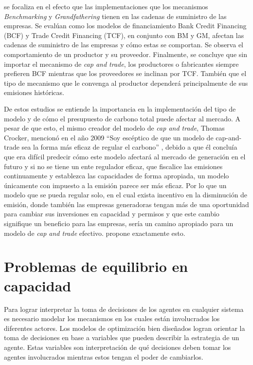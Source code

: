  se focaliza en el efecto que las implementaciones que los mecanismos \textit{Benchmarking} y \textit{Grandfathering} tienen en las cadenas de suministro de las empresas. Se evalúan como los modelos de financiamiento Bank Credit Financing (BCF) y Trade Credit Financing (TCF), en conjunto con BM y GM, afectan las cadenas de suministro de las empresas y cómo estas se comportan. Se observa el comportamiento de un productor y su proveedor. Finalmente, se concluye que sin importar el mecanismo de \textit{cap and trade}, los productores o fabricantes siempre prefieren BCF mientras que los proveedores se inclinan por TCF. También que el tipo de mecanismo que le convenga al productor dependerá principalmente de sus emisiones históricas.
\vspace{2.5mm}

De estos estudios se entiende la importancia en la implementación del tipo de modelo y de cómo el presupuesto de carbono total puede afectar al mercado. A pesar de que esto, el mismo creador del modelo de \textit{cap and trade}, Thomas Crocker, mencionó en el año 2009 ``Soy escéptico de que un modelo de cap-and-trade sea la forma más eficaz de regular el carbono'' , debido a que él concluía que era difícil predecir cómo este modelo afectará al mercado de generación en el futuro y si no se tiene un ente regulador eficaz, que fiscalice las emisiones continuamente y establezca las capacidades de forma apropiada, un modelo únicamente con impuesto a la emisión parece ser más eficaz. Por lo que un modelo que se pueda regular solo, en el cual exista incentivo en la disminución de emisión, donde también las empresas generadoras tengan más de una oportunidad para cambiar sus inversiones en capacidad y permisos y que este cambio signifique un beneficio para las empresas, sería un camino apropiado para un modelo de \textit{cap and trade} efectivo.  propone exactamente esto.


\section{Problemas de equilibrio en capacidad} \label{c21}

Para lograr interpretar la toma de decisiones de los agentes en cualquier sistema es necesario modelar los mecanismos en los cuales están involucrados los diferentes actores. Los modelos de optimización bien diseñados logran orientar la toma de decisiones en base a variables que pueden describir la estrategia de un agente. Estas variables son interpretación de qué decisiones deben tomar los agentes involucrados mientras estos tengan el poder de cambiarlos. 
\vspace{2.5mm}

